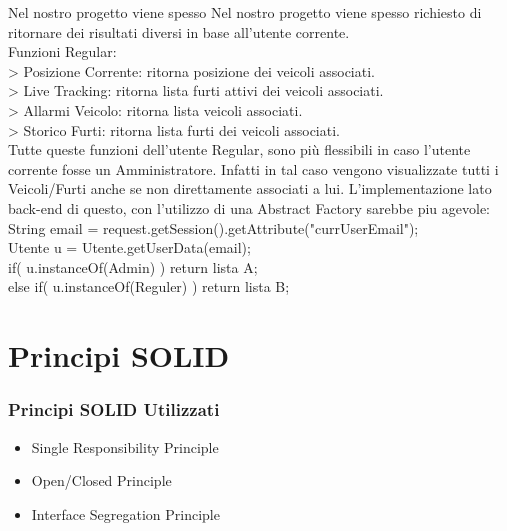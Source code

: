 \documentclass[a4paper,12pt]{beamer}
\begin{document}
\begin{frame}
Nel nostro progetto viene spesso 
Nel nostro progetto viene spesso richiesto di ritornare dei risultati diversi in base all'utente corrente.\\
Funzioni Regular:\\
> Posizione Corrente: ritorna posizione dei veicoli associati.\\
> Live Tracking: ritorna lista furti attivi dei veicoli associati.\\
> Allarmi Veicolo: ritorna lista veicoli associati.\\
> Storico Furti: ritorna lista furti dei veicoli associati.\\
Tutte queste funzioni dell'utente Regular, sono più flessibili in caso l'utente corrente fosse un Amministratore. Infatti in tal caso vengono visualizzate tutti i Veicoli/Furti anche se non direttamente associati a lui.
L'implementazione lato back-end di questo, con l'utilizzo di una Abstract Factory sarebbe piu agevole:\\
\small{
String email = request.getSession().getAttribute("currUserEmail");\\
Utente u = Utente.getUserData(email);\\
if( u.instanceOf(Admin) ) return lista A;\\
else if( u.instanceOf(Reguler) ) return lista B;}
\end{frame}

\pagebreak

\section{Principi SOLID}
\begin{frame}
\frametitle{Principi SOLID Utilizzati}
\begin{itemize}
\item Single Responsibility Principle
\item Open/Closed Principle
\item Interface Segregation Principle
\end{itemize}
\end{frame}

\pagebreak
\end{document}
